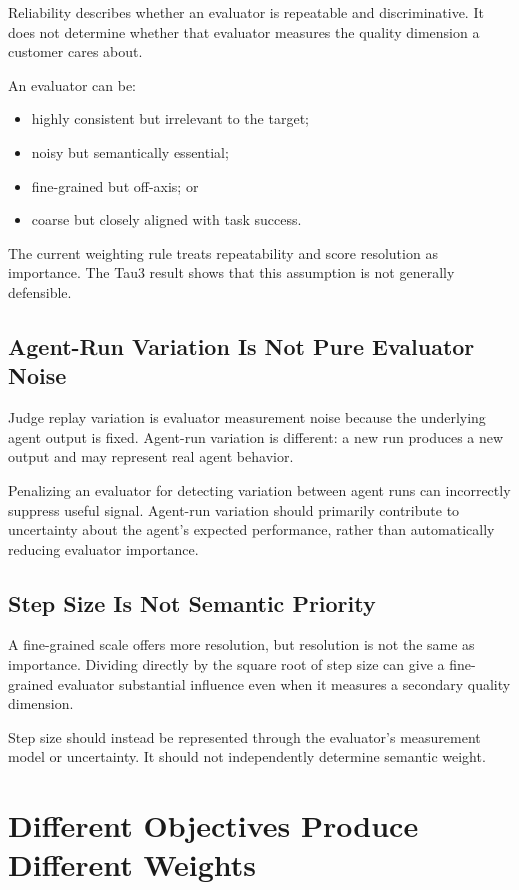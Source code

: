 \documentclass[11pt]{article}
\begin{document}
Reliability describes whether an evaluator is repeatable and discriminative.
It does not determine whether that evaluator measures the quality dimension a
customer cares about.

An evaluator can be:

\begin{itemize}
    \item highly consistent but irrelevant to the target;
    \item noisy but semantically essential;
    \item fine-grained but off-axis; or
    \item coarse but closely aligned with task success.
\end{itemize}

The current weighting rule treats repeatability and score resolution as
importance. The Tau3 result shows that this assumption is not generally
defensible.

\subsection{Agent-Run Variation Is Not Pure Evaluator Noise}

Judge replay variation is evaluator measurement noise because the underlying
agent output is fixed. Agent-run variation is different: a new run produces a
new output and may represent real agent behavior.

Penalizing an evaluator for detecting variation between agent runs can
incorrectly suppress useful signal. Agent-run variation should primarily
contribute to uncertainty about the agent's expected performance, rather than
automatically reducing evaluator importance.

\subsection{Step Size Is Not Semantic Priority}

A fine-grained scale offers more resolution, but resolution is not the same as
importance. Dividing directly by the square root of step size can give a
fine-grained evaluator substantial influence even when it measures a secondary
quality dimension.

Step size should instead be represented through the evaluator's measurement
model or uncertainty. It should not independently determine semantic weight.

\section{Different Objectives Produce Different Weights}
\end{document}
